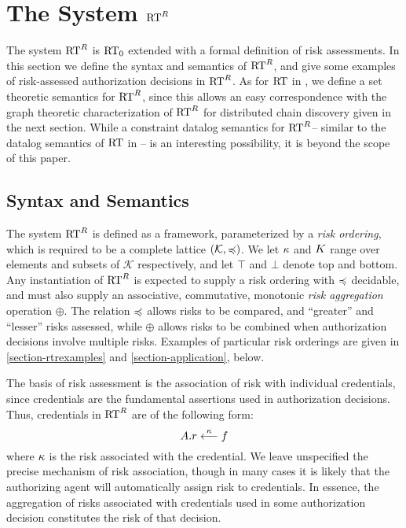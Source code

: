 \section{The System $\text{RT}^R$}
\label{section-rtr}

The system $\text{RT}^R$ is $\text{RT}_0$ extended with a formal definition of risk
assessments.  In this section we define the syntax and semantics of
$\text{RT}^R$, and give some examples of risk-assessed authorization
decisions in $\text{RT}^R$.  As for $\text{RT}$ in \cite{Li:2003-02}, we define a
set theoretic semantics for $\text{RT}^R$, since this allows an easy
correspondence with the graph theoretic characterization of $\text{RT}^R$ for
distributed chain discovery given in the next section.  While a
constraint datalog semantics for $\text{RT}^R$-- similar to the datalog semantics of
$\text{RT}$ in \cite{Li:2003-01}-- is an interesting possibility, it is
beyond the scope of this paper.

\rmemfig

\subsection{Syntax and Semantics}

The system $\text{RT}^R$ is defined as a framework, parameterized by a
\emph{risk ordering}, which is required to be a complete lattice
$(\mathcal{K},\preccurlyeq)$.  We let $\kappa$ and $K$ range over elements
and subsets of $\mathcal{K}$ respectively, and let $\top$ and $\bot$
denote top and bottom.  Any instantiation of $\text{RT}^R$ is expected to
supply a risk ordering with $\preccurlyeq$ decidable, and must also supply an
associative, commutative, monotonic \emph{risk aggregation} operation
$\oplus$.
The relation $\preccurlyeq$ allows risks to be compared, and ``greater'' and
``lesser'' risks assessed, while $\oplus$ allows risks to be
combined when authorization decisions involve multiple risks.
Examples of particular risk orderings are given in
\autoref{section-rtrexamples} and \autoref{section-application},
below.

The basis of risk assessment is the association of risk with
individual credentials, since credentials are the fundamental assertions
used in authorization decisions.  Thus, credentials in $\text{RT}^R$ are of the
following form:
$$
A.r \stackrel{\kappa}{\longleftarrow} f
$$ where $\kappa$ is the risk associated with the credential.  We leave
unspecified the precise mechanism of risk association, though in many
cases it is likely that the authorizing agent will automatically
assign risk to credentials.  In essence, the aggregation of risks
associated with credentials used in some authorization decision
constitutes the risk of that decision.


